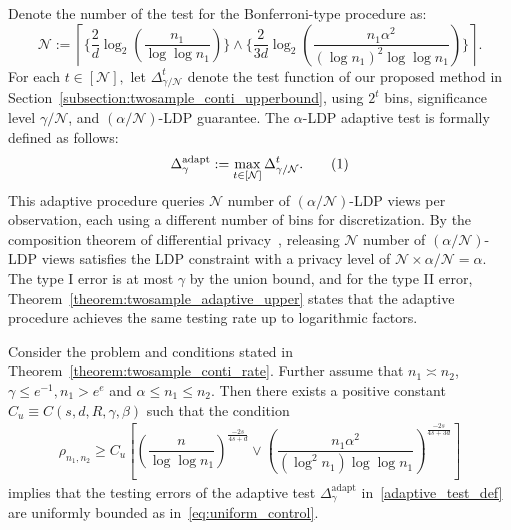 \documentclass[twoside,11pt]{article}
\newcommand\numberthis{\addtocounter{equation}{1}\tag{\theequation}}
\newcommand{\rhoTwosample}{\rho_{\sampleSize_1, \sampleSize_2}}
\newcommand{\adaptiveBinNumIndex}{t}
\newcommand{\dimDensity}{d} %
\newcommand{\sampleSize}{n}
\newcommand{\smoothness}{s}
\newcommand{\ballRadius}{R}
\newcommand{\nTest}{\mathcal{N}} %
\newcommand{\privacyParameter}{\alpha} %
\newcommand{\maxErrorTypeOne}{\gamma} %
\newcommand{\adaptiveSingleTest}[1]{\Delta^{#1}}
\begin{document}
Denote the number of the test for the Bonferroni-type procedure as:
\begin{equation}\label{def:n_test_adaptive}
	\mathcal{N}
	:=
	\left\lceil \bigg\{
	\dfrac{2}{\dimDensity}
	\log_2{
		\left(
		\dfrac
		{\sampleSize_1}
		{\log \log \sampleSize_1}
		\right) \bigg\}
	}
	\wedge
	\bigg\{\dfrac{2}{3\dimDensity}
	\log_2{
		\left(
		\dfrac
		{\sampleSize_1 \privacyParameter^2}
		{(\log \sampleSize_1)^2\log \log \sampleSize_1}
		\right) \bigg\}
	}	
	\right\rceil.
\end{equation}
For each ${\adaptiveBinNumIndex} \in [\nTest],$
let $\adaptiveSingleTest{\adaptiveBinNumIndex}_{\maxErrorTypeOne/\nTest}$ denote the test function of our proposed method in Section~\ref{subsection:twosample_conti_upperbound},
using $2^{\adaptiveBinNumIndex}$  bins, significance level $\gamma/\nTest$,
and $( \privacyParameter/\nTest)$-LDP guarantee.
The $\privacyParameter$-LDP adaptive test is formally defined as follows:
\begin{align*}
	\Delta^{\text{adapt}}_{\maxErrorTypeOne}
	:=
	\max_{{\adaptiveBinNumIndex} \in [\nTest]} \adaptiveSingleTest{\adaptiveBinNumIndex}_{\maxErrorTypeOne/\nTest}.
	\numberthis \label{adaptive_test_def}
\end{align*}
\noindent%
This adaptive procedure queries $\nTest$ number of $( \privacyParameter/\nTest)$-LDP views per observation, each using a different number of bins for discretization.
By the composition theorem of differential privacy~\citep{mcsherry_mechanism_2007},  releasing $\nTest$ number of $(\privacyParameter/\nTest)$-LDP views satisfies the LDP constraint with a privacy level of $\nTest \times \privacyParameter/\nTest  = \privacyParameter$. The type I error is at most $\gamma$ by the union bound, and for the type II error, Theorem~\ref{theorem:twosample_adaptive_upper} states that the adaptive procedure achieves the same testing rate up to logarithmic factors.
%
\begin{theorem}\label{theorem:twosample_adaptive_upper}
	Consider the problem and conditions stated in Theorem~\ref{theorem:twosample_conti_rate}.
	Further assume that $\sampleSize_1 \asymp \sampleSize_2$,
	$\maxErrorTypeOne \leq e^{-1},
	\sampleSize_1 > e^e$ and
	$\privacyParameter \leq n_1 \leq \sampleSize_2$.
	Then there exists a positive constant
	$C_u \equiv C(\smoothness, \dimDensity, \ballRadius, \gamma, \beta)$ such that the condition
	\begin{align*}
		\rhoTwosample
		\geq
		C_u
		\left[
		\left(
		\dfrac
		{n}
		{\log \log \sampleSize_1 }
		\right)
		^{
			\frac{-2s}{4\smoothness+\dimDensity}
		}
		\vee
		\left(
		\dfrac
		{\sampleSize_1 \privacyParameter^2}
		{
			(\log^2{\sampleSize_1})
			\log \log \sampleSize_1 
		}
		\right)^{
			\frac{-2s}{4\smoothness+3\dimDensity}
		}
		\right]
	\end{align*} 
	implies that the testing errors of the adaptive test $\Delta^{\mathrm{adapt}}_{\maxErrorTypeOne}$ in~\eqref{adaptive_test_def} are uniformly bounded as in~\eqref{eq:uniform_control}.
\end{theorem}
\end{document}
